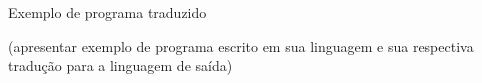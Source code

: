 
Exemplo de programa traduzido

(apresentar exemplo de programa escrito em sua linguagem e sua respectiva tradução para a linguagem de saída)
